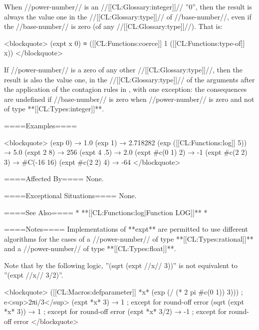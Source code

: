 When //power-number// is an //[[CL:Glossary:integer]]// ''0'', then the result is always the value one in the //[[CL:Glossary:type]]// of //base-number//, even if the //base-number// is zero (of any //[[CL:Glossary:type]]//). That is:

<blockquote>
(expt x 0) ≡ ([[CL:Functions:coerce]] 1 ([[CL:Functions:type-of]] x))
</blockquote> 

If //power-number// is a zero of any other //[[CL:Glossary:type]]//, then the result is also the value one, in the //[[CL:Glossary:type]]// of the arguments after the application of the contagion rules in \secref\NumericContagionRules, with one exception: the consequences are undefined if //base-number// is zero when //power-number// is zero and not of type **[[CL:Types:integer]]**.

====Examples====

<blockquote>
(exp 0) → 1.0 
(exp 1) → 2.718282 
(exp ([[CL:Functions:log]] 5)) → 5.0 
(expt 2 8) → 256 
(expt 4 .5) → 2.0 
(expt #c(0 1) 2) → -1 
(expt #c(2 2) 3) → #C(-16 16) 
(expt #c(2 2) 4) → -64 
</blockquote>

====Affected By====
None.

====Exceptional Situations====
None.

====See Also====
  * **[[CL:Functions:log|Function LOG]]**
  * {\secref\FloatSubstitutability}

====Notes====
Implementations of **expt** are permitted to use different algorithms for the cases of a //power-number// of type **[[CL:Types:rational]]** and a //power-number// of type **[[CL:Types:float]]**.

Note that by the following logic, ''(sqrt (expt //x// 3))'' is not equivalent to ''(expt //x// 3/2)''.

<blockquote>
([[CL:Macros:defparameter]] *x* (exp (/ (* 2 pi #c(0 1)) 3))) ; e<sup>2πi/3</sup>
(expt *x* 3) → 1 ; except for round-off error 
(sqrt (expt *x* 3)) → 1 ; except for round-off error 
(expt *x* 3/2) → -1 ; except for round-off error </blockquote>

  
